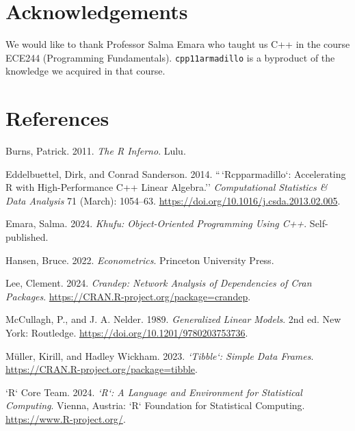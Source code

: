 \hypertarget{acknowledgements}{%
\section{Acknowledgements}\label{acknowledgements}}

We would like to thank Professor Salma Emara who taught us C++ in the course
ECE244 (Programming Fundamentals). \texttt{cpp11armadillo} is a byproduct of the
knowledge we acquired in that course.

\hypertarget{references}{%
\section*{References}\label{references}}

\hypertarget{refs}{}
\begin{cslreferences}
\leavevmode\hypertarget{ref-burns2011}{}%
Burns, Patrick. 2011. \emph{The R Inferno}. Lulu.

\leavevmode\hypertarget{ref-eddelbuettel2014}{}%
Eddelbuettel, Dirk, and Conrad Sanderson. 2014. ``\,`Rcpparmadillo`: Accelerating R with High-Performance C++ Linear Algebra.'' \emph{Computational Statistics \& Data Analysis} 71 (March): 1054--63. \url{https://doi.org/10.1016/j.csda.2013.02.005}.

\leavevmode\hypertarget{ref-emara2024}{}%
Emara, Salma. 2024. \emph{Khufu: Object-Oriented Programming Using C++}. Self-published.

\leavevmode\hypertarget{ref-hansen2022}{}%
Hansen, Bruce. 2022. \emph{Econometrics}. Princeton University Press.

\leavevmode\hypertarget{ref-lee2024}{}%
Lee, Clement. 2024. \emph{Crandep: Network Analysis of Dependencies of Cran Packages}. \url{https://CRAN.R-project.org/package=crandep}.

\leavevmode\hypertarget{ref-mccullagh1989}{}%
McCullagh, P., and J. A. Nelder. 1989. \emph{Generalized Linear Models}. 2nd ed. New York: Routledge. \url{https://doi.org/10.1201/9780203753736}.

\leavevmode\hypertarget{ref-tibble}{}%
Müller, Kirill, and Hadley Wickham. 2023. \emph{`Tibble`: Simple Data Frames}. \url{https://CRAN.R-project.org/package=tibble}.

\leavevmode\hypertarget{ref-r2024}{}%
`R` Core Team. 2024. \emph{`R`: A Language and Environment for Statistical Computing}. Vienna, Austria: `R` Foundation for Statistical Computing. \url{https://www.R-project.org/}.


\end{cslreferences}
